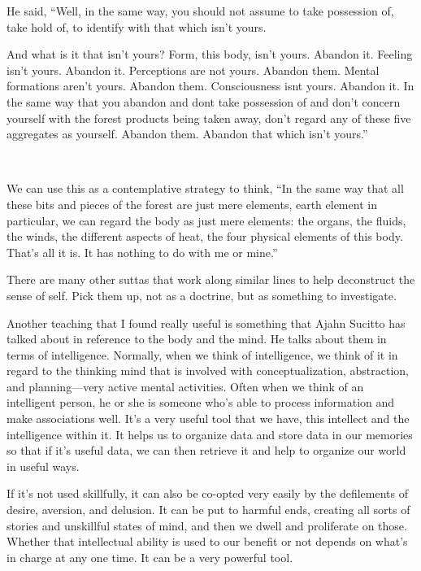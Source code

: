 He said, ``Well, in the same way, you should not assume to take possession of, take hold of, to identify with that which isn't yours.

And what is it that isn't yours? Form, this body, isn't yours. Abandon it. Feeling isn't yours. Abandon it. Perceptions are not yours. Abandon them. Mental formations aren't yours. Abandon them. Consciousness isn\textquotesingle t yours. Abandon it. In the same way that you abandon and don\textquotesingle t take possession of and don't concern yourself with the forest products being taken away, don't regard any of these five aggregates as yourself. Abandon them. Abandon that which isn't yours.''

~

We can use this as a contemplative strategy to think, ``In the same way that all these bits and pieces of the forest are just mere elements, earth element in particular, we can regard the body as just mere elements: the organs, the fluids, the winds, the different aspects of heat, the four physical elements of this body. That's all it is. It has nothing to do with me or mine.''

There are many other suttas that work along similar lines to help deconstruct the sense of self. Pick them up, not as a doctrine, but as something to investigate.~

Another teaching that I found really useful is something that Ajahn Sucitto has talked about in reference to the body and the mind. He talks about them in terms of intelligence. Normally, when we think of intelligence, we think of it in regard to the thinking mind that is involved with conceptualization, abstraction, and planning---very active mental activities. Often when we think of an intelligent person, he or she is someone who's able to process information and make associations well. It's a very useful tool that we have, this intellect and the intelligence within it. It helps us to organize data and store data in our memories so that if it's useful data, we can then retrieve it and help to organize our world in useful ways.

If it's not used skillfully, it can also be co-opted very easily by the defilements of desire, aversion, and delusion. It can be put to harmful ends, creating all sorts of stories and unskillful states of mind, and then we dwell and proliferate on those. Whether that intellectual ability is used to our benefit or not depends on what's in charge at any one time. It can be a very powerful tool.

